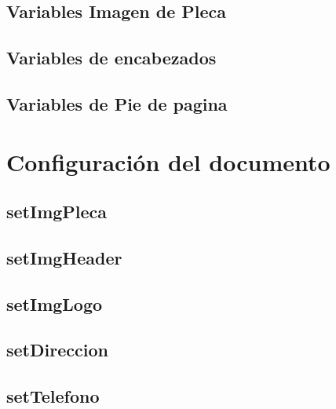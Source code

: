     \subsection{Variables Imagen de Pleca}

    \hypertarget{varImgHeaderPar}{}
    \hypertarget{varImgHeaderInp}{}
    \hypertarget{varImgHeaderHeight}{}
    \hypertarget{varImgLogoHeight}{}
    \hypertarget{varImgLogoPar}{}
    \hypertarget{varImgLogoInp}{}
    \subsection{Variables de encabezados}
    
    \hypertarget{varDireccion}{}
    \hypertarget{varTelefono}{}
    \hypertarget{varCorreo}{}
    \subsection{Variables de Pie de pagina}

\section{Configuración del documento}
    
    \hypertarget{setImgPleca}{}
    \subsection{setImgPleca}
    
    \hypertarget{setImgHeader}{}
    \subsection{setImgHeader}
    
    \hypertarget{setImgLogo}{}
    \subsection{setImgLogo}
    
    \hypertarget{setDireccion}{}
    \subsection{setDireccion}
    
    \hypertarget{setTelefono}{}
    \subsection{setTelefono}
    
